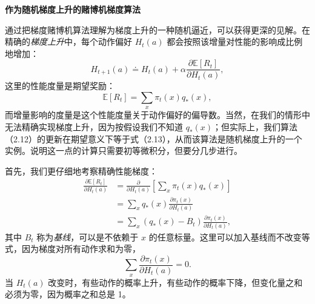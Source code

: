 \documentclass[UTF8, 12pt, fontset=fandol, oneside]{ctexart}
\begin{document}
\noindent\textbf{作为随机梯度上升的赌博机梯度算法}

\vspace{0.4em}
通过把梯度赌博机算法理解为梯度上升的一种随机逼近，可以获得更深的见解。在精确的\emph{梯度上升}中，每个动作偏好 $H_t(a)$ 都会按照该增量对性能的影响成比例地增加：
\begin{equation}
H_{t+1}(a)\doteq H_t(a)+\alpha\frac{\partial \mathbb{E}[R_t]}{\partial H_t(a)},
\tag{2.13}
\end{equation}
这里的性能度量是期望奖励：
\[
\mathbb{E}[R_t]=\sum_x\pi_t(x)q_*(x),
\]
而增量影响的度量是这个性能度量关于动作偏好的偏导数。当然，在我们的情形中无法精确实现梯度上升，因为按假设我们不知道 $q_*(x)$；但实际上，我们算法（2.12）的更新在期望意义下等于式（2.13），从而该算法是随机梯度上升的一个实例。说明这一点的计算只需要初等微积分，但要分几步进行。

首先，我们更仔细地考察精确性能梯度：
\[
\begin{aligned}
\frac{\partial \mathbb{E}[R_t]}{\partial H_t(a)}
&= \frac{\partial}{\partial H_t(a)}\left[\sum_x\pi_t(x)q_*(x)\right]\\
&= \sum_x q_*(x)\frac{\partial \pi_t(x)}{\partial H_t(a)}\\
&= \sum_x \left(q_*(x)-B_t\right)\frac{\partial \pi_t(x)}{\partial H_t(a)},
\end{aligned}
\]
其中 $B_t$ 称为\emph{基线}，可以是不依赖于 $x$ 的任意标量。这里可以加入基线而不改变等式，因为梯度对所有动作求和为零，
\[
\sum_x \frac{\partial \pi_t(x)}{\partial H_t(a)}=0.
\]
当 $H_t(a)$ 改变时，有些动作的概率上升，有些动作的概率下降，但变化量之和必须为零，因为概率之和总是 1。
\end{document}
